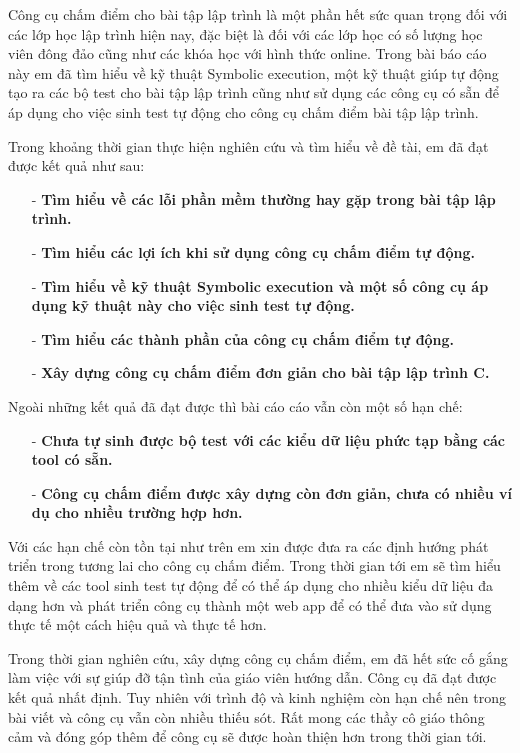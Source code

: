 \documentclass[12pt,a4paper]{article}
\begin{document}
Công cụ chấm điểm cho bài tập lập trình là một phần hết sức quan trọng đối với các lớp học lập trình hiện nay, đặc biệt là đối với các lớp học có số lượng học viên đông đảo cũng như các khóa học với hình thức online. Trong bài báo cáo này em đã tìm hiểu về kỹ thuật Symbolic execution, một kỹ thuật giúp tự động tạo ra các bộ test cho bài tập lập trình cũng như sử dụng các công cụ có sẵn để áp dụng cho việc sinh test tự động cho công cụ chấm điểm bài tập lập trình.

Trong khoảng thời gian thực hiện nghiên cứu và tìm hiểu về đề tài, em đã đạt được kết quả như sau:

\begin{itemize}
\item[-] \textbf{Tìm hiểu về các lỗi phần mềm thường hay gặp trong bài tập lập trình.}
\item[-] \textbf{Tìm hiểu  các lợi ích khi sử dụng công cụ chấm điểm tự động.}
\item[-] \textbf{Tìm hiểu về kỹ thuật Symbolic execution và một số công cụ áp dụng kỹ thuật này cho việc sinh test tự động.}
\item[-] \textbf{Tìm hiểu các thành phần của công cụ chấm điểm tự động.}
\item[-] \textbf{Xây dựng công cụ chấm điểm đơn giản cho bài tập lập trình C.}
\end{itemize}

Ngoài những kết quả đã đạt được thì bài cáo cáo vẫn còn một số hạn chế:

\begin{itemize}
\item[-] \textbf{Chưa tự sinh được bộ test với các kiểu dữ liệu phức tạp bằng các tool có sẵn.}
\item[-] \textbf{Công cụ chấm điểm được xây dựng còn đơn giản, chưa có nhiều ví dụ cho nhiều trường hợp hơn.}
\end{itemize}

Với các hạn chế còn tồn tại như trên em xin được đưa ra các định hướng phát triển trong tương lai cho công cụ chấm điểm. Trong thời gian tới em sẽ tìm hiểu thêm về các tool sinh test tự động để có thể áp dụng cho nhiều kiểu dữ liệu đa dạng hơn và phát triển công cụ thành một web app để có thể đưa vào sử dụng thực tế một cách hiệu quả và thực tế hơn.

Trong thời gian nghiên cứu, xây dựng công cụ chấm điểm, em đã hết sức cố gắng làm việc với sự giúp đỡ tận tình của giáo viên hướng dẫn. Công cụ đã đạt được kết quả nhất định. Tuy nhiên với trình độ và kinh nghiệm còn hạn chế nên trong bài viết và công cụ vẫn còn nhiều thiếu sót. Rất mong các thầy cô giáo thông cảm và đóng góp thêm để công cụ sẽ được hoàn thiện hơn trong thời gian tới. \newpage




\end{document}

